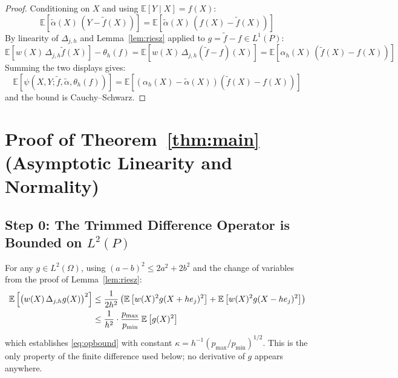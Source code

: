 \documentclass[12pt]{article}
\newcommand{\E}{\mathbb{E}}
\newcommand{\Dh}{\Delta_{j,h}}
\begin{document}
	\begin{proof}
		Conditioning on $X$ and using $\E[Y \mid X] = f(X)$:
		\begin{equation}
			\E\left[\tilde{\alpha}(X)\,(Y - \tilde{f}(X))\right]
			= \E\left[\tilde{\alpha}(X)\,(f(X) - \tilde{f}(X))\right]
		\end{equation}
		By linearity of $\Dh$ and Lemma~\ref{lem:riesz} applied to
		$g = \tilde{f} - f \in L^1(P)$:
		\begin{equation}
			\E\left[w(X)\, \Dh \tilde{f}(X)\right] - \theta_h(f)
			= \E\left[w(X)\, \Dh (\tilde{f} - f)(X)\right]
			= \E\left[\alpha_h(X)\,(\tilde{f}(X) - f(X))\right]
		\end{equation}
		Summing the two displays gives:
		\begin{equation}
			\E\left[\psi(X, Y; \tilde{f}, \tilde{\alpha}, \theta_h(f))\right]
			= \E\left[(\alpha_h(X) - \tilde{\alpha}(X))(\tilde{f}(X) - f(X))\right]
		\end{equation}
		and the bound is Cauchy--Schwarz.
	\end{proof}
	
	\section{Proof of Theorem~\ref{thm:main} (Asymptotic Linearity and Normality)}
	\label{app:thm_main}
	
	\subsection{Step 0: The Trimmed Difference Operator is Bounded on $L^2(P)$}
	
	For any $g \in L^2(\Omega)$, using $(a - b)^2 \leq 2a^2 + 2b^2$ and the
	change of variables from the proof of Lemma~\ref{lem:riesz}:
	\begin{align}
		\E\left[\bigl(w(X)\, \Dh g(X)\bigr)^2\right]
		&\leq \frac{1}{2h^2}\left(
		\E\left[w(X)^2 g(X + h e_j)^2\right]
		+ \E\left[w(X)^2 g(X - h e_j)^2\right]\right) \notag \\
		&\leq \frac{1}{h^2} \cdot \frac{p_{\max}}{p_{\min}}\, \E\left[g(X)^2\right]
		\label{eq:opbound_proof}
	\end{align}
	which establishes \eqref{eq:opbound} with constant
	$\kappa = h^{-1}(p_{\max}/p_{\min})^{1/2}$. This is the only property of the
	finite difference used below; no derivative of $g$ appears anywhere.
	
\end{document}
